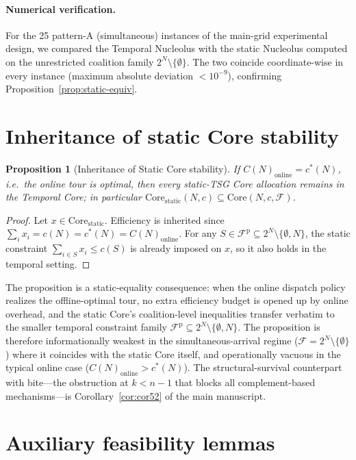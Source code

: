 \documentclass[11pt]{article}
\newcommand{\F}{\mathcal{F}}
\newcommand{\Fp}{\mathcal{F}^{\mathrm{p}}}
\newcommand{\cstar}{c^{\ast}}
\theoremstyle{plain}
\newtheorem{proposition}[theorem]{Proposition}
\theoremstyle{definition}
\theoremstyle{remark}
\begin{document}
\paragraph{Numerical verification.} For the 25 pattern-A (simultaneous) instances of the main-grid experimental design, we compared the Temporal Nucleolus with the static Nucleolus computed on the unrestricted coalition family $2^N\setminus\{\emptyset\}$. The two coincide coordinate-wise in every instance (maximum absolute deviation $<10^{-9}$), confirming Proposition~\ref{prop:static-equiv}.

\section{Inheritance of static Core stability}
\label{app:inheritance}

\begin{proposition}[Inheritance of Static Core stability]
\label{prop:core-inheritance}
If $C(N)_{\text{online}} = \cstar(N)$, i.e.\ the online tour is optimal, then every static-TSG Core allocation remains in the Temporal Core; in particular $\mathrm{Core}_{\text{static}}(N,c)\subseteq\mathrm{Core}(N,c,\F)$.
\end{proposition}

\begin{proof}
Let $x\in\mathrm{Core}_{\text{static}}$. Efficiency is inherited since $\sum_i x_i = c(N) = \cstar(N) = C(N)_{\text{online}}$. For any $S\in\Fp\subseteq 2^N\setminus\{\emptyset, N\}$, the static constraint $\sum_{i\in S} x_i\le c(S)$ is already imposed on $x$, so it also holds in the temporal setting.
\end{proof}

The proposition is a static-equality consequence: when the online dispatch policy realizes the offline-optimal tour, no extra efficiency budget is opened up by online overhead, and the static Core's coalition-level inequalities transfer verbatim to the smaller temporal constraint family $\Fp\subseteq 2^N\setminus\{\emptyset, N\}$. The proposition is therefore informationally weakest in the simultaneous-arrival regime ($\F = 2^N\setminus\{\emptyset\}$) where it coincides with the static Core itself, and operationally vacuous in the typical online case ($C(N)_{\text{online}}>\cstar(N)$). The structural-survival counterpart with bite---the obstruction at $k<n-1$ that blocks all complement-based mechanisms---is Corollary~\ref{cor:cor52} of the main manuscript.

\section{Auxiliary feasibility lemmas}
\label{app:complement-feasibility-lemmas}
\end{document}

